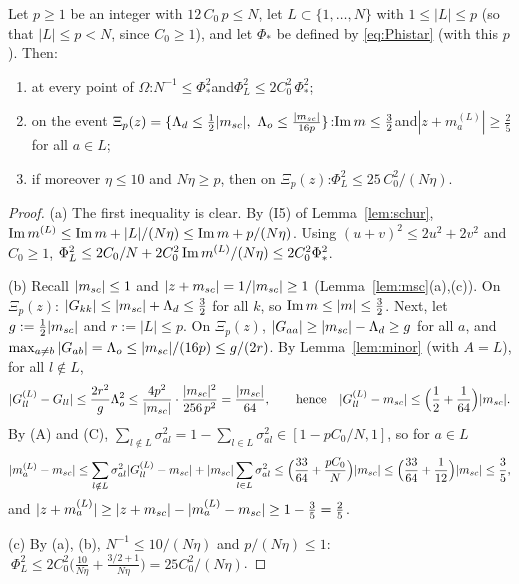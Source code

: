 \begin{lemma}\label{lem:FAevent}
Let $p\ge1$ be an integer with $12\,C_0\,p\le N$, let $L\subset\{1,\dots,N\}$ with $1\le|L|\le p$ (so that $|L|\le p<N$, since $C_0\ge1$), and let $\Phi_*$ be defined by \eqref{eq:Phistar} (with this $p$). Then:
\begin{enumerate}[label=\textup{(\alph*)},leftmargin=2.2em,itemsep=1pt]
\item at every point of $\Omega$:\quad $N^{-1}\le\Phi_*^2$\quad and\quad $\Phi_L^2\le2C_0^2\,\Phi_*^2$;
\item on the event $\Xi_p(z)=\{\Ld\le\frac12|\msc|,\ \Lo\le\frac{|\msc|}{16p}\}$:\quad $\operatorname{Im} m\le\frac32$\quad and\quad $|z+m_a^{(L)}|\ge\frac25$ for all $a\in L$;
\item if moreover $\eta\le10$ and $N\eta\ge p$, then on $\Xi_p(z)$:\quad $\Phi_L^2\le25\,C_0^2/(N\eta)$.
\end{enumerate}
\end{lemma}
\begin{proof}
(a) The first inequality is clear. By (I5) of Lemma~\ref{lem:schur}, $\operatorname{Im} m^{(L)}\le\operatorname{Im} m+|L|/(N\eta)\le\operatorname{Im} m+p/(N\eta)$. Using $(u+v)^2\le2u^2+2v^2$ and $C_0\ge1$,
$\Phi_L^2\le2C_0/N+2C_0^2\operatorname{Im} m^{(L)}/(N\eta)\le2C_0^2\Phi_*^2$.

(b) Recall $|m_{sc}|\le1$ and $|z+m_{sc}|=1/|m_{sc}|\ge1$ (Lemma~\ref{lem:msc}(a),(c)). On $\Xi_p(z)$: $|G_{kk}|\le|m_{sc}|+\Lambda_d\le\frac32$ for all $k$, so $\operatorname{Im} m\le|m|\le\frac32$. Next, let $g:=\frac12|m_{sc}|$ and $r:=|L|\le p$. On $\Xi_p(z)$, $|G_{aa}|\ge|m_{sc}|-\Lambda_d\ge g$ for all $a$,
and $\max_{a\ne b}|G_{ab}|=\Lambda_o\le|m_{sc}|/(16p)\le g/(2r)$. By Lemma~\ref{lem:minor} (with $A=L$), for all $l\notin L$,
\[
 |G^{(L)}_{ll}-G_{ll}|\le\frac{2r^2}{g}\Lambda_o^2\le\frac{4p^2}{|m_{sc}|}\cdot\frac{|m_{sc}|^2}{256\,p^2}=\frac{|m_{sc}|}{64},\qquad\text{hence}\quad|G^{(L)}_{ll}-m_{sc}|\le\Big(\frac12+\frac1{64}\Big)|m_{sc}|.
\]
By (A) and (C), $\sum_{l\notin L}\sigma_{al}^2=1-\sum_{l\in L}\sigma_{al}^2\in[1-pC_0/N,1]$, so for $a\in L$
\[
 |m_a^{(L)}-m_{sc}|\le\sum_{l\notin L}\sigma_{al}^2|G^{(L)}_{ll}-m_{sc}|+|m_{sc}|\sum_{l\in L}\sigma_{al}^2\le\Big(\frac{33}{64}+\frac{pC_0}N\Big)|m_{sc}|\le\Big(\frac{33}{64}+\frac1{12}\Big)|m_{sc}|\le\frac35,
\]
and $|z+m_a^{(L)}|\ge|z+m_{sc}|-|m_a^{(L)}-m_{sc}|\ge1-\frac35=\frac25$.

(c) By (a), (b), $N^{-1}\le10/(N\eta)$ and $p/(N\eta)\le1$: $\ \Phi_L^2\le2C_0^2\big(\frac{10}{N\eta}+\frac{3/2+1}{N\eta}\big)=25C_0^2/(N\eta)$.
\end{proof}

